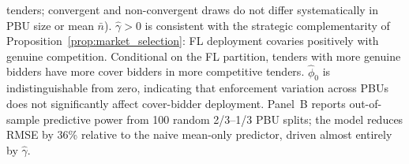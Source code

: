 \begin{table}[!htbp]
\begin{threeparttable}
\begin{tablenotes}
tenders; convergent and non-convergent draws do not differ
systematically in PBU size or mean $\bar{n}$). $\hat{\gamma} > 0$ is consistent with the strategic complementarity
of Proposition~\ref{prop:market_selection}: FL deployment covaries
positively with genuine competition. Conditional on the FL partition,
tenders with more genuine bidders have more cover
bidders in more competitive tenders. $\hat{\phi}_0$ is
indistinguishable from zero, indicating that enforcement variation
across PBUs does not significantly affect cover-bidder deployment.
Panel~B reports out-of-sample predictive power from 100 random
2/3--1/3 PBU splits; the model reduces RMSE by 36\% relative to
the naive mean-only predictor, driven almost entirely by
$\hat{\gamma}$.
\end{tablenotes}
\end{threeparttable}
\end{table}
